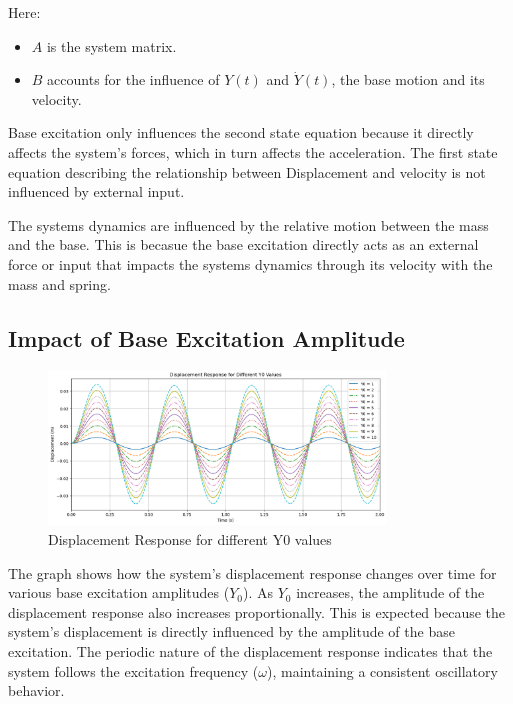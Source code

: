 \documentclass[12pt,a4paper]{article}
\begin{document}
Here:
\begin{itemize}
    \item \( A \) is the system matrix.
    \item \( B \) accounts for the influence of \( Y(t) \) and \( \dot{Y}(t) \), the base motion and its velocity.
\end{itemize}


Base excitation only influences the second state equation because it directly affects the system's forces, which in turn affects the acceleration. The first state equation describing the relationship between Displacement and velocity is not influenced by external input.

The systems dynamics are influenced by the relative motion between the mass and the base. This is becasue the base excitation directly acts as an external force or input that impacts the systems dynamics through its velocity with the mass and spring. 



\subsection{Impact of Base Excitation Amplitude}
\begin{figure}[H]
    \centering
    \includegraphics[width=0.8\textwidth]{disp_response.png} 
    \caption{Displacement Response for different Y0 values}
    \label{fig:system}
\end{figure}
{\vspace{10pt}}


The graph shows how the system's displacement response changes over time for various base excitation amplitudes (\(Y_0\)). As \(Y_0\) increases, the amplitude of the displacement response also increases proportionally. This is expected because the system's displacement is directly influenced by the amplitude of the base excitation. The periodic nature of the displacement response indicates that the system follows the excitation frequency (\(\omega\)), maintaining a consistent oscillatory behavior.
\end{document}
